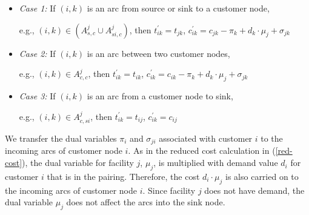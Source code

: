 \begin {itemize}
\item {\em Case 1:} If $(i,k)$ is an arc from source or sink to a customer node, 

  e.g., $(i,k) \in (A^{j}_{s,c} \cup A^{j}_{si,c})$, then 
  $t^{'}_{ik}=t_{jk}$, $c^{'}_{ik}=c_{jk}-\pi_{k}+d_k \cdot \mu_j+\sigma_{jk}$ 
\item {\em Case 2:} If $(i,k)$ is an arc between two customer nodes, 

  e.g., $(i,k) \in A^{j}_{c,c}$, 
  then   $t^{'}_{ik}=t_{ik}$, $c^{'}_{ik}=c_{ik}-\pi_{k}+d_k \cdot \mu_j+\sigma_{jk}$ 
\item {\em Case 3:} If $(i,k)$ is an arc from a customer node to sink, 

  e.g., $(i,k) \in A^{j}_{c,si}$, then $t^{'}_{ik}=t_{ij}$, $c^{'}_{ik}=c_{ij}$
\end{itemize} 

We transfer the dual variables $\pi_i$ and $\sigma_{ji}$ associated with customer 
$i$ to the incoming arcs of customer node $i$. As in the reduced cost calculation
in (\ref{red-cost}), the dual variable for facility $j$, $\mu_j$, is multiplied with
demand value $d_i$ for customer $i$ that is in the pairing. Therefore, the cost 
$d_i \cdot \mu_j$ is also carried on to the incoming arcs of customer node $i$. Since facility
$j$ does not have demand, the dual variable $\mu_j$ does not affect the arcs 
into the sink node.  

